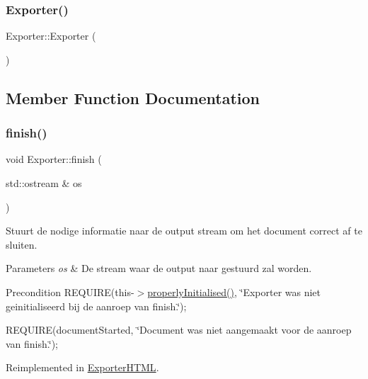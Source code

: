 \subsubsection{\texorpdfstring{Exporter()}{Exporter()}}
{\footnotesize\ttfamily Exporter\+::\+Exporter (\begin{DoxyParamCaption}{ }\end{DoxyParamCaption})}



\subsection{Member Function Documentation}
\mbox{\label{class_exporter_ae477714f462d70cfc5b3970f91fcc4ed}} 
\subsubsection{\texorpdfstring{finish()}{finish()}}
{\footnotesize\ttfamily void Exporter\+::finish (\begin{DoxyParamCaption}\item[{std\+::ostream \&}]{os }\end{DoxyParamCaption})\hspace{0.3cm}{\ttfamily [virtual]}}



Stuurt de nodige informatie naar de output stream om het document correct af te sluiten. 


\begin{DoxyParams}{Parameters}
{\em os} & De stream waar de output naar gestuurd zal worden. \\
\hline
\end{DoxyParams}
\begin{DoxyPrecond}{Precondition}
R\+E\+Q\+U\+I\+RE(this-\/$>$\hyperlink{class_exporter_aafd9df9210aeefd7bb7fd434fc317cf0}{properly\+Initialised()}, \char`\"{}\+Exporter was niet geinitialiseerd bij de aanroep van finish.\char`\"{}); 

R\+E\+Q\+U\+I\+RE(document\+Started, \char`\"{}\+Document was niet aangemaakt voor de aanroep van finish.\char`\"{}); 
\end{DoxyPrecond}


Reimplemented in \hyperlink{class_exporter_h_t_m_l_aefa1c658f3c3c55bd7725bdad09629b3}{Exporter\+H\+T\+ML}.

